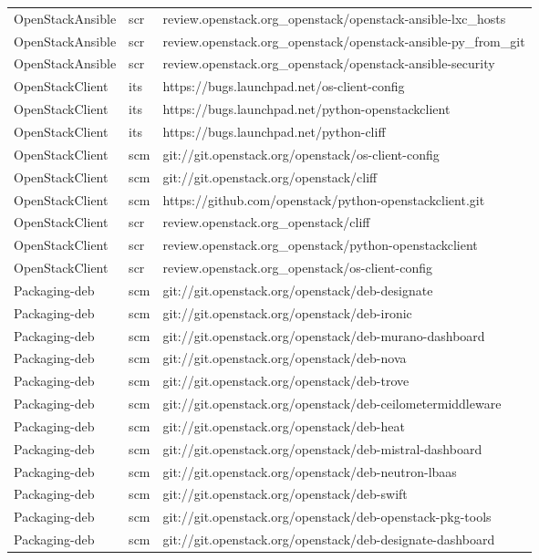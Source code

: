 \begin{center}
\begin{longtable}{|p{4cm}|p{1cm}|p{10cm}|}
OpenStackAnsible&scr&review.openstack.org\_openstack/openstack-ansible-lxc\_hosts\\ 
OpenStackAnsible&scr&review.openstack.org\_openstack/openstack-ansible-py\_from\_git\\ 
OpenStackAnsible&scr&review.openstack.org\_openstack/openstack-ansible-security\\ 
OpenStackClient&its&https://bugs.launchpad.net/os-client-config\\ 
OpenStackClient&its&https://bugs.launchpad.net/python-openstackclient\\ 
OpenStackClient&its&https://bugs.launchpad.net/python-cliff\\ 
OpenStackClient&scm&git://git.openstack.org/openstack/os-client-config\\ 
OpenStackClient&scm&git://git.openstack.org/openstack/cliff\\ 
OpenStackClient&scm&https://github.com/openstack/python-openstackclient.git\\ 
OpenStackClient&scr&review.openstack.org\_openstack/cliff\\ 
OpenStackClient&scr&review.openstack.org\_openstack/python-openstackclient\\ 
OpenStackClient&scr&review.openstack.org\_openstack/os-client-config\\ 
Packaging-deb&scm&git://git.openstack.org/openstack/deb-designate\\ 
Packaging-deb&scm&git://git.openstack.org/openstack/deb-ironic\\ 
Packaging-deb&scm&git://git.openstack.org/openstack/deb-murano-dashboard\\ 
Packaging-deb&scm&git://git.openstack.org/openstack/deb-nova\\ 
Packaging-deb&scm&git://git.openstack.org/openstack/deb-trove\\ 
Packaging-deb&scm&git://git.openstack.org/openstack/deb-ceilometermiddleware\\ 
Packaging-deb&scm&git://git.openstack.org/openstack/deb-heat\\ 
Packaging-deb&scm&git://git.openstack.org/openstack/deb-mistral-dashboard\\ 
Packaging-deb&scm&git://git.openstack.org/openstack/deb-neutron-lbaas\\ 
Packaging-deb&scm&git://git.openstack.org/openstack/deb-swift\\ 
Packaging-deb&scm&git://git.openstack.org/openstack/deb-openstack-pkg-tools\\ 
Packaging-deb&scm&git://git.openstack.org/openstack/deb-designate-dashboard\\ 

\end{longtable}
\end{center}
